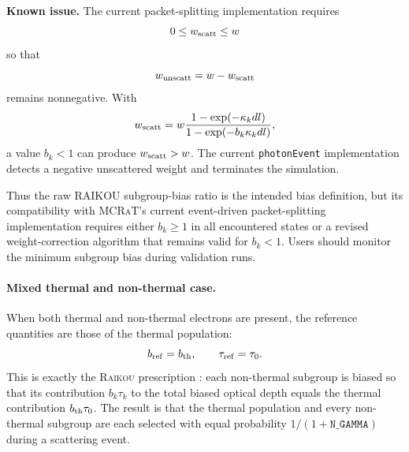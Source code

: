 \documentclass[12pt,a4paper]{article}
\newcommand{\code}[1]{\texttt{#1}}
\newcommand{\raikou}{\textsc{Raikou}}
\newcommand{\mcrat}{\textsc{MCRaT}}
\newenvironment{knownissue}{%
	\begin{framed}\noindent\textbf{Known issue.}\quad}
	{\end{framed}}
\begin{document}
\begin{knownissue}
	The current packet-splitting implementation requires
	\begin{equation}
		0
		\le
		w_{\rm scatt}
		\le
		w
	\end{equation}
	so that
	\begin{equation}
		w_{\rm unscatt}
		=
		w-w_{\rm scatt}
	\end{equation}
	remains nonnegative. With
	\begin{equation}
		w_{\rm scatt}
		=
		w
		\frac{1-\exp(-\kappa_k dl)}
		{1-\exp(-b_k\kappa_k dl)},
	\end{equation}
	a value $b_k<1$ can produce $w_{\rm scatt}>w$. The current
	\code{photonEvent} implementation detects a negative unscattered weight
	and terminates the simulation.
	
	Thus the raw RAIKOU subgroup-bias ratio is the intended bias definition,
	but its compatibility with \mcrat{}'s current event-driven packet-splitting
	implementation requires either $b_k\ge1$ in all encountered states or a
	revised weight-correction algorithm that remains valid for $b_k<1$.
	Users should monitor the minimum subgroup bias during validation runs.
\end{knownissue}


\paragraph{Mixed thermal and non-thermal case.}
When both thermal and non-thermal electrons are present, the reference
quantities are those of the thermal population:
\begin{equation}
	b_{\rm ref} = b_{\rm th}, \qquad \tau_{\rm ref} = \tau_0.
	\label{eq:ref_thermal}
\end{equation}
This is exactly the \raikou{} prescription \citep[\raikou{}
Eq.~48]{kawashima2023}: each non-thermal subgroup is biased so that its
contribution $b_k \tau_k$ to the total biased optical depth equals the
thermal contribution $b_{\rm th}\tau_0$.  The result is that the thermal
population and every non-thermal subgroup are each selected with equal
probability $1/(1 + \code{N\_GAMMA})$ during a scattering event.
\end{document}
